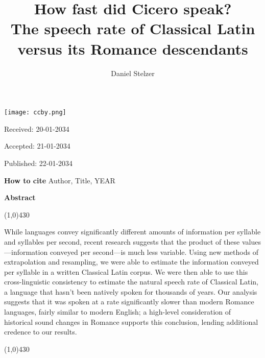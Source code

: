 \documentclass[12pt,twoside]{article}
\title{{\Huge{}How fast did Cicero speak?}\\{\Large{}The speech rate of Classical Latin versus its Romance descendants}}
\author{Daniel Stelzer}
\affil{University of Illinois at Urbana-Champaign\\stelzer3@illinois.edu}
\date{}
\makeatletter
\newcommand*{\tocref}[1]{\hyperref[{#1}]{\ref*{#1}.~\nameref*{#1}}}
\def\maketitle{{%
		\renewenvironment{tabular}[2][]
		{\begin{flushleft}}
			{\end{flushleft}}
		\AB@maketitle}}
\makeatother
\begin{document}
\maketitle

\thispagestyle{first}

\vspace{0.5cm}
\noindent \texttt{[image: ccby.png]}

\hfill Received: 20-01-2034 

\hfill Accepted: 21-01-2034

\hfill Published: 22-01-2034

\vspace{1cm}

\noindent \textbf{How to cite} Author, Title, YEAR

\vspace{1.5cm}

\noindent \textbf{Abstract}
\begin{center}
 	\line(1,0){430}
\end{center}
\vspace{-0,3cm}
\noindent While languages convey significantly different amounts of information per syllable and syllables per second, recent research suggests that the product of these values---information conveyed per second---is much less variable. Using new methods of extrapolation and resampling, we were able to estimate the information conveyed per syllable in a written Classical Latin corpus. We were then able to use this cross-linguistic consistency to estimate the natural speech rate of Classical Latin, a language that hasn't been natively spoken for thousands of years. Our analysis suggests that it was spoken at a rate significantly slower than modern Romance languages, fairly similar to modern English; a high-level consideration of historical sound changes in Romance supports this conclusion, lending additional credence to our results. \\
\vspace{-0,4cm}
\begin{center}
	\line(1,0){430}
\end{center}


\end{document}
